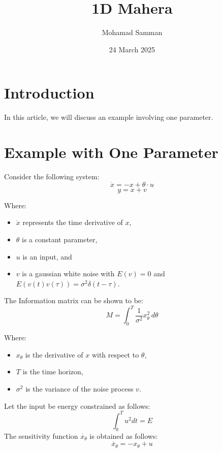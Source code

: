 \documentclass[a4paper]{article}
\begin{document}
\title{1D Mahera}
\author{Mohamad Samman}
\date{24 March 2025}
\maketitle

\section{Introduction}

In this article, we will discuss an example involving one parameter.

\section{Example with One Parameter}
Consider the following system:
\begin{equation}
\dot{x} = -x + \theta \cdot u
\end{equation}
\begin{equation}
y = x + v
\end{equation}

Where:
\begin{itemize}
    \item \( \dot{x} \) represents the time derivative of \( x \),
    \item \( \theta \) is a constant parameter,
    \item \( u \) is an input, and
    \item \( v \) is a gaussian white noise with \(E(v)=0\) and \(E(v(t)v(\tau))=\sigma^2\delta(t-\tau)\).
\end{itemize}
The Information matrix can be shown to be:
\begin{equation}
M = \int_0^T \frac{1}{\sigma^2} x_{\theta}^2 \, d\theta
\end{equation}

Where:
\begin{itemize}
    \item \( x_{\theta} \) is the derivative of \( x \) with respect to \( \theta \),
    \item \( T \) is the time horizon,
    \item \( \sigma^2 \) is the variance of the noise process \( v \).
\end{itemize}
Let the input be energy constrained as follows:
\begin{equation}
    \int_0^T u^2 dt = E
    \label{nrjconst}
\end{equation}
The sensitivity function $\dot{x_\theta}$ is obtained as follows:
\begin{equation}
  \dot{x_\theta}  = -x_\theta + u
\end{equation}
\end{document}
